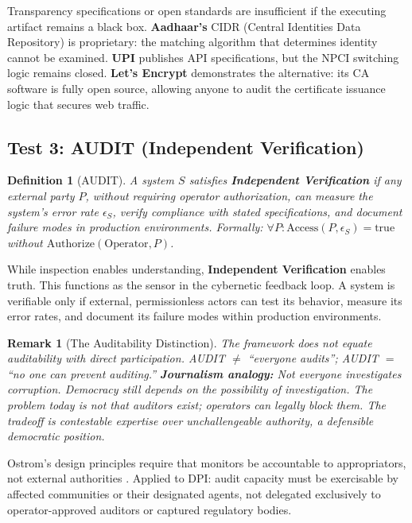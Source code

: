 \documentclass{article}
\newtheorem{definition}{Definition}
\newtheorem{remark}{Remark}
\begin{document}
Transparency specifications or open standards are insufficient if the executing artifact remains a black box. \textbf{Aadhaar's} CIDR (Central Identities Data Repository) is proprietary: the matching algorithm that determines identity cannot be examined. \textbf{UPI} publishes API specifications, but the NPCI switching logic remains closed. \textbf{Let's Encrypt} demonstrates the alternative: its CA software is fully open source, allowing anyone to audit the certificate issuance logic that secures web traffic.

\subsection{Test 3: AUDIT (Independent Verification)}

\begin{definition}[AUDIT]
\label{def:audit}
A system $S$ satisfies \textbf{Independent Verification} if any external party $P$, without requiring operator authorization, can measure the system's error rate $\epsilon_S$, verify compliance with stated specifications, and document failure modes in production environments. Formally: $\forall P: \text{Access}(P, \epsilon_S) = \text{true}$ without $\text{Authorize}(\text{Operator}, P)$.
\end{definition}

While inspection enables understanding, \textbf{Independent Verification} enables truth. This functions as the sensor in the cybernetic feedback loop. A system is verifiable only if external, permissionless actors can test its behavior, measure its error rates, and document its failure modes within production environments.

\begin{remark}[The Auditability Distinction]
The framework does not equate auditability with direct participation. AUDIT $\neq$ ``everyone audits''; AUDIT $=$ ``no one can prevent auditing.'' \textbf{Journalism analogy:} Not everyone investigates corruption. Democracy still depends on the \textit{possibility} of investigation. The problem today is not that auditors exist; operators can legally block them. The tradeoff is contestable expertise over unchallengeable authority, a defensible democratic position.
\end{remark}

Ostrom's design principles require that monitors be accountable to appropriators, not external authorities \citep{ostrom1990}. Applied to DPI: audit capacity must be exercisable by affected communities or their designated agents, not delegated exclusively to operator-approved auditors or captured regulatory bodies.
\end{document}
